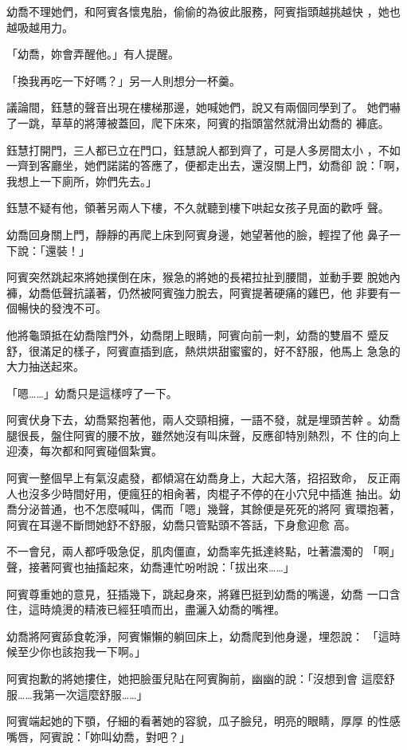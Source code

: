 幼喬不理她們，和阿賓各懷鬼胎，偷偷的為彼此服務，阿賓指頭越挑越快
，她也越吸越用力。

「幼喬，妳會弄醒他。」有人提醒。

「換我再吃一下好嗎？」另一人則想分一杯羹。

議論間，鈺慧的聲音出現在樓梯那邊，她喊她們，說又有兩個同學到了。
她們嚇了一跳，草草的將薄被蓋回，爬下床來，阿賓的指頭當然就滑出幼喬的
褲底。

鈺慧打開門，三人都已立在門口，鈺慧說人都到齊了，可是人多房間太小
，不如一齊到客廳坐，她們諾諾的答應了，便都走出去，還沒關上門，幼喬卻
說：「啊，我想上一下廁所，妳們先去。」

鈺慧不疑有他，領著另兩人下樓，不久就聽到樓下哄起女孩子見面的歡呼
聲。

幼喬回身關上門，靜靜的再爬上床到阿賓身邊，她望著他的臉，輕捏了他
鼻子一下說：「還裝！」

阿賓突然跳起來將她撲倒在床，猴急的將她的長裙拉扯到腰間，並動手要
脫她內褲，幼喬低聲抗議著，仍然被阿賓強力脫去，阿賓提著硬痛的雞巴，他
非要有一個暢快的發洩不可。

他將龜頭抵在幼喬陰門外，幼喬閉上眼睛，阿賓向前一刺，幼喬的雙眉不
蹙反舒，很滿足的樣子，阿賓直插到底，熱烘烘甜蜜蜜的，好不舒服，他馬上
急急的大力抽送起來。

「嗯……」幼喬只是這樣哼了一下。

阿賓伏身下去，幼喬緊抱著他，兩人交頸相擁，一語不發，就是埋頭苦幹
。幼喬腿很長，盤住阿賓的腰不放，雖然她沒有叫床聲，反應卻特別熱烈，不
住的向上迎湊，每次都和阿賓碰個紮實。

阿賓一整個早上有氣沒處發，都傾瀉在幼喬身上，大起大落，招招致命，
反正兩人也沒多少時間好用，便瘋狂的相肏著，肉棍子不停的在小穴兒中插進
抽出。幼喬分泌普通，也不怎麼喊叫，偶而「嗯」幾聲，其餘便是死死的將阿
賓環抱著，阿賓在耳邊不斷問她舒不舒服，幼喬只管點頭不答話，下身愈迎愈
高。

不一會兒，兩人都呼吸急促，肌肉僵直，幼喬率先抵達終點，吐著濃濁的
「啊」聲，接著阿賓也抽搐起來，幼喬連忙吩咐說：「拔出來……」

阿賓尊重她的意見，狂插幾下，跳起身來，將雞巴挺到幼喬的嘴邊，幼喬
一口含住，這時燒燙的精液已經狂噴而出，盡灑入幼喬的嘴裡。

幼喬將阿賓舔食乾淨，阿賓懶懶的躺回床上，幼喬爬到他身邊，埋怨說：
「這時候至少你也該抱我一下啊。」

阿賓抱歉的將她摟住，她把臉蛋兒貼在阿賓胸前，幽幽的說：「沒想到會
這麼舒服……我第一次這麼舒服……」

阿賓端起她的下顎，仔細的看著她的容貌，瓜子臉兒，明亮的眼睛，厚厚
的性感嘴唇，阿賓說：「妳叫幼喬，對吧？」

